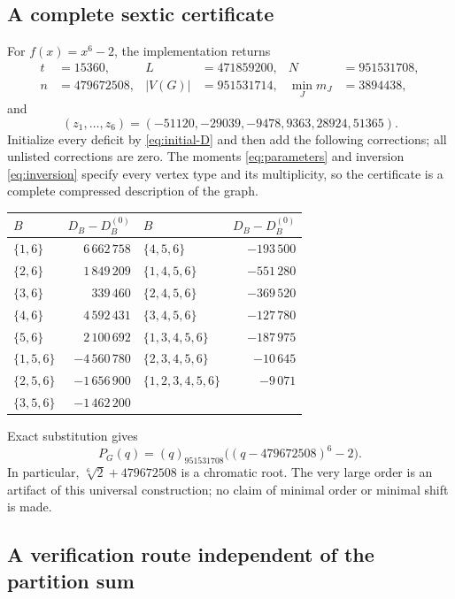 \documentclass[11pt,a4paper]{article}
\theoremstyle{definition}
\newcommand{\fall}[2]{(#1)_{#2}}
\begin{document}
\subsection{A complete sextic certificate}

For $f(x)=x^6-2$, the implementation returns
\begin{align*}
 t&=15360,&L&=471859200,&N&=951531708,\\
 n&=479672508,&|V(G)|&=951531714,&\min_J m_J&=3894438,
\end{align*}
and
\[
 (z_1,\ldots,z_6)=(-51120,-29039,-9478,9363,28924,51365).
\]
Initialize every deficit by \eqref{eq:initial-D} and then add the
following corrections; all unlisted corrections are zero.
The moments \eqref{eq:parameters} and inversion
\eqref{eq:inversion} specify every vertex type and its multiplicity,
so the certificate is a complete compressed description of the graph.

\begin{center}
\small
\begin{tabular}{@{}lr@{\qquad}lr@{}}
\toprule
$B$ & $D_B-D_B^{(0)}$ & $B$ & $D_B-D_B^{(0)}$\\
\midrule
$\{1,6\}$ & $6\,662\,758$ & $\{4,5,6\}$ & $-193\,500$ \\
$\{2,6\}$ & $1\,849\,209$ & $\{1,4,5,6\}$ & $-551\,280$ \\
$\{3,6\}$ & $339\,460$ & $\{2,4,5,6\}$ & $-369\,520$ \\
$\{4,6\}$ & $4\,592\,431$ & $\{3,4,5,6\}$ & $-127\,780$ \\
$\{5,6\}$ & $2\,100\,692$ & $\{1,3,4,5,6\}$ & $-187\,975$ \\
$\{1,5,6\}$ & $-4\,560\,780$ & $\{2,3,4,5,6\}$ & $-10\,645$ \\
$\{2,5,6\}$ & $-1\,656\,900$ & $\{1,2,3,4,5,6\}$ & $-9\,071$ \\
$\{3,5,6\}$ & $-1\,462\,200$ &  &  \\
\bottomrule
\end{tabular}
\end{center}

Exact substitution gives
\begin{equation}\label{eq:sextic}
 P_G(q)=\fall q{951531708}\bigl((q-479672508)^6-2\bigr).
\end{equation}
In particular, $\sqrt[6]{2}+479672508$ is a chromatic root.
The very large order is an artifact of this universal construction;
no claim of minimal order or minimal shift is made.

\subsection{A verification route independent of the partition sum}
\end{document}
